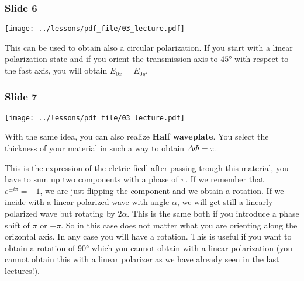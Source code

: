 \documentclass[../main/main.tex]{subfiles}
\begin{document}
\subsubsection*{Slide 6}

\begin{minipage}[]{0.5\linewidth}
\centering
\texttt{[image: ../lessons/pdf\_file/03\_lecture.pdf]}
\end{minipage}
\hspace{0.3cm}\vspace{0.3cm}
\begin{minipage}[c]{0.47\linewidth}

This can be used to obtain also a circular polarization. If you start with a linear polarization state and if you orient the transmission axis to \( 45° \) with respect to the fast axis, you will obtain \( E_{0x}=E_{0y} \).

\end{minipage}

\newpage

\subsubsection*{Slide 7}

\begin{minipage}[]{0.5\linewidth}
\centering
\texttt{[image: ../lessons/pdf\_file/03\_lecture.pdf]}
\end{minipage}
\hspace{0.3cm}\vspace{0.3cm}
\begin{minipage}[c]{0.47\linewidth}
With the same idea, you can also realize \textbf{Half waveplate}. You select the thickness of your material in such a way to obtain \( \Delta \Phi = \pi  \).

This is the expression of the elctric fiedl after passing trough this material, you have to sum up two components with a phase of \( \pi  \). If we remember that \( e^{\pm i \pi } = -1 \), we are just flipping the component and we obtain a rotation. If we incide with a linear polarized wave with angle \( \alpha  \), we will get still a linearly polarized wave but rotating by \( 2 \alpha  \). This is the same both if you introduce a phase shift of \( \pi  \) or \( -\pi  \). So in this case does not matter what you are orienting along the orizontal axis. In any case you will have a rotation.
This is useful if you want to obtain a rotation of 90° which you cannot obtain with a linear polarization (you cannot obtain this with a linear polarizer as we have already seen in the last lectures!).

\end{minipage}
\end{document}
